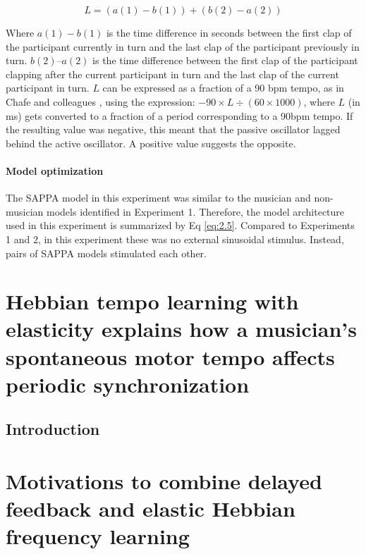 \documentclass{report}
\begin{document}
\begin{equation}
L = (a(1) - b(1)) + (b(2) - a(2)) \label{eq:2.9}
\end{equation}

Where $a(1)- b(1)$ is the time difference in seconds between the first clap of the participant currently in turn and the last clap of the participant previously in turn. $b(2)–a(2)$ is the time difference between the first clap of the participant clapping after the current participant in turn and the last clap of the current participant in turn. $L$ can be expressed as a fraction of a 90 bpm tempo, as in Chafe and colleagues \cite{chafe2010effect}, using the expression: $- 90 \times L \div (60 \times 1000)$, where $L$ (in ms) gets converted to a fraction of a period corresponding to a 90bpm tempo. If the resulting value was negative, this meant that the passive oscillator lagged behind the active oscillator. A positive value suggests the opposite.

\subsubsection{Model optimization}

The SAPPA model in this experiment was similar to the musician and non-musician models identified in Experiment 1. Therefore, the model architecture used in this experiment is summarized by Eq \eqref{eq:2.5}. Compared to Experiments 1 and 2, in this experiment these was no external sinusoidal stimulus. Instead, pairs of SAPPA models stimulated each other.

\chapter{Hebbian tempo learning with elasticity explains how a musician's spontaneous motor tempo affects periodic synchronization}

\section{Introduction}


\chapter{Motivations to combine delayed feedback and elastic Hebbian frequency learning}
\end{document}

